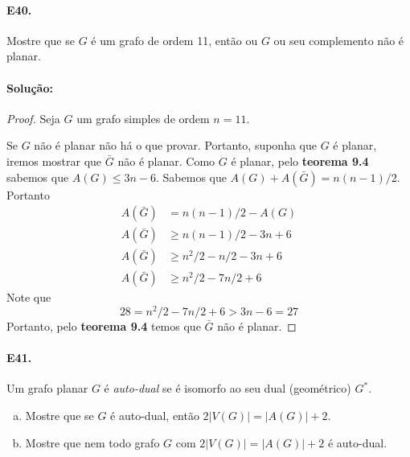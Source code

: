 \documentclass[11pt,a4paper,notitlepage]{exam}
\begin{document}
    \paragraph{E40.} Mostre que se $G$ é um grafo de ordem 11, então
    ou $G$ ou seu complemento não é planar.
    \paragraph{Solução:}
    \begin{proof}
        Seja $G$ um grafo simples de ordem $n=11$.\par
        Se $G$ não é planar não há o que provar. Portanto, suponha que $G$ é planar, iremos mostrar que $\bar{G}$ não é
        planar. Como $G$ é planar, pelo \textbf{teorema 9.4} sabemos
        que $A(G) \leq 3n - 6$. Sabemos que $A(G)+
        A(\bar{G}) = n(n-1)/2$. Portanto
        \begin{align*}
            A(\bar{G}) &= n(n-1)/2 - A(G)\\
            A(\bar{G}) &\geq n(n-1)/2 - 3n + 6\\
            A(\bar{G}) &\geq n^2/2 -n/2 -3n + 6\\
            A(\bar{G}) &\geq n^2/2 -7n/2 + 6 
        \end{align*}
        Note que  
        $$
            28 = n^2/2 -7n/2 + 6 > 3n - 6 = 27
        $$
        Portanto, pelo \textbf{teorema 9.4} temos que $\bar{G}$ não é
        planar.
    \end{proof}
    \paragraph{E41.} Um grafo planar $G$ é \textit{auto-dual} se é
    isomorfo ao seu dual (geométrico) $G^*$.
    \begin{enumerate}[a)]
        \item Mostre que se $G$ é auto-dual, então $2|V(G)|=|A(G)| +
            2$.
        \item Mostre que nem todo grafo $G$ com $2|V(G)| = |A(G)| +2$ é
            auto-dual.
    \end{enumerate}
\end{document}
